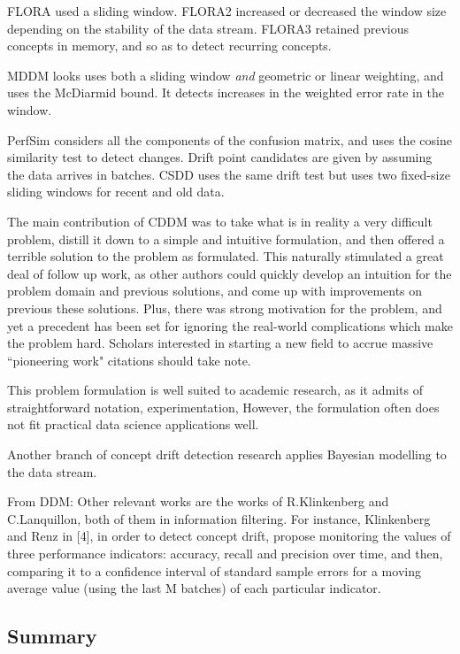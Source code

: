FLORA used a sliding window. FLORA2 increased or decreased the window size depending on the stability of the data stream. FLORA3 retained previous concepts in memory, and so as to detect recurring concepts.

MDDM looks uses both a sliding window {\it and} geometric or linear weighting, and uses the McDiarmid bound. It detects increases in the weighted error rate in the window.

PerfSim considers all the components of the confusion matrix, and uses the cosine similarity test to detect changes. Drift point candidates are given by assuming the data arrives in batches. CSDD uses the same drift test but uses two fixed-size sliding windows for recent and old data.

The main contribution of CDDM was to take what is in reality a very difficult problem, distill it down to a simple and intuitive formulation, and then offered a terrible solution to the problem as formulated. This naturally stimulated a great deal of follow up work, as other authors could quickly develop an intuition for the problem domain and previous solutions, and come up with improvements on previous these solutions. Plus, there was strong motivation for the problem, and yet a precedent has been set for ignoring the real-world complications which make the problem hard. Scholars interested in starting a new field to accrue massive  ``pioneering work" citations should take note.

This problem formulation is well suited to academic research, as it admits of straightforward notation, experimentation,
However, the formulation often does not fit practical data science applications well.

Another branch of concept drift detection research applies Bayesian modelling to the data stream.

From DDM: Other relevant works are the works of R.Klinkenberg and C.Lanquillon, both of them in information filtering. For instance, Klinkenberg and Renz in [4], in order to detect concept drift, propose monitoring the values of three performance indicators: accuracy, recall and precision over time, and then, comparing it to a confidence interval of standard sample errors for a moving average value (using the last M batches) of each particular indicator.

\subsection{Summary}

